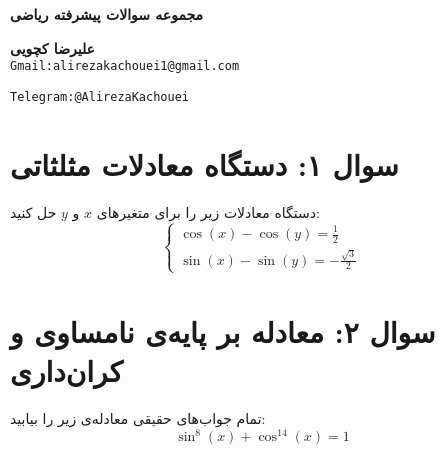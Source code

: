 \documentclass[12pt]{article}
\begin{document}
	\begin{center}
		\Large\textbf{مجموعه سوالات پیشرفته ریاضی}
		\vspace{0.5cm}
	\end{center}
\begin{center}
	\Large\textbf{علیرضا کچویی} \\
	\vspace{0.5cm} %
	\normalsize\texttt{Gmail:alirezakachouei1@gmail.com} %
	
	
\end{center}
\begin{center}
\normalsize\texttt{Telegram:@AlirezaKachouei}
\end{center}
	\hrulefill
	\vspace{1cm}
	\section*{سوال ۱: دستگاه معادلات مثلثاتی}
	دستگاه معادلات زیر را برای متغیرهای \(x\) و \(y\) حل کنید:
	\begin{displaymath}
		\begin{cases}
			\cos(x) - \cos(y) = \frac{1}{2} \\
			\sin(x) - \sin(y) = -\frac{\sqrt{3}}{2}
		\end{cases}
	\end{displaymath}
	
	
	\vspace{1cm}
	\hrulefill
	
	
	\vspace{1cm}
	\section*{سوال ۲: معادله بر پایه‌ی نامساوی و کران‌داری}
	تمام جواب‌های حقیقی معادله‌ی زیر را بیابید:
	\begin{displaymath}
		\sin^8(x) + \cos^{14}(x) = 1
	\end{displaymath}
	
	
	\vspace{1cm}
	\hrulefill
	\vspace{1cm}
\end{document}
